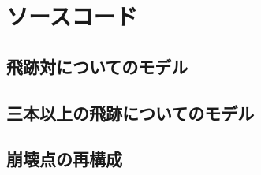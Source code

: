 
\appendix 

\chapter{ソースコード} \label{sec:Code}
\section{飛跡対についてのモデル} \label{sec:CodePairModel}
\section{三本以上の飛跡についてのモデル} \label{sec:CodeVLSTM}
\section{崩壊点の再構成} \label{sec:CodePairProduction}